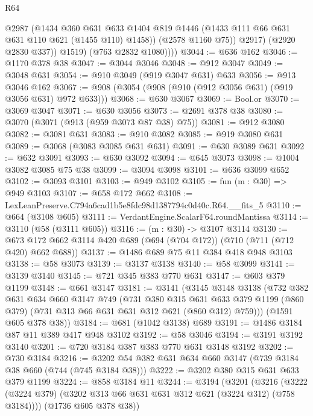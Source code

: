 \begin{lexlean}{R64}
\begin{coremodule}
                  @2987
                  (@1434
                    @360
                    @631
                    @633
                    @1404
                    @819
                    @1446
                    (@1433 @111 @66 @631 @631 @110 @621 (@1455 @110) @1458))
                  (@2578 @1160 @75))
                @2917)
              (@2920 @2830 @337))
            @1519)
          (@763 @2832 @1080))))
@3044 := @636 @162
@3046 := @1170 @378 @38
@3047 := @3044 @3046
@3048 := @912 @3047
@3049 := @3048 @631
@3054 := @910 @3049 (@919 @3047 @631) @633
@3056 := @913 @3046 @162
@3067 := @908 (@3054 (@908 (@910 (@912 @3056 @631) (@919 @3056 @631) @972 @633)))
@3068 := @630 @3067
@3069 := Bool.or
@3070 := @3069 @3047
@3071 := @630 @3056
@3073 := @2691 @378 @38
@3080 := @3070 (@3071 (@913 (@959 @3073 @87 @38) @75))
@3081 := @912 @3080
@3082 := @3081 @631
@3083 := @910 @3082
@3085 := @919 @3080 @631
@3089 := @3068 (@3083 @3085 @631 @631)
@3091 := @630 @3089 @631
@3092 := @632 @3091
@3093 := @630 @3092
@3094 := @645 @3073
@3098 := @1004 @3082 @3085 @75 @38
@3099 := @3094 @3098
@3101 := @636 @3099 @652
@3102 := @3093 @3101
@3103 := @949 @3102
@3105 := fun (m : @30) => @949 @3103
@3107 := @658 @172 @662
@3108 := LexLeanPreserve.C794a6cad1b5e8fdc98d1387794c0d40c.R64.__fits_5
@3110 := @664 (@3108 @605)
@3111 := VerdantEngine.ScalarF64.roundMantissa
@3114 := @3110 (@58 (@3111 @605))
@3116 := (m : @30) -> @3107 @3114
@3130 := @673 @172 @662 @3114 @420 @689 (@694 (@704 @172)) (@710 (@711 (@712 @420) @662 @688))
@3137 := @1486 @689 @75 @11 @384 @418 @948 @3103
@3138 := @58 @3073
@3139 := @3137 @3138
@3140 := @58 @3099
@3141 := @3139 @3140
@3145 := @721 @345 @383 @770 @631
@3147 := @603 @379 @1199
@3148 := @661 @3147
@3181 := @3141
    (@3145
      @3148
      @3138
      (@732
        @382
        @631
        @634
        @660
        @3147
        @749
        (@731
          @380
          @315
          @631
          @633
          @379
          @1199
          (@860 @379)
          (@731 @313 @66 @631 @631 @312 @621 (@860 @312) @759)))
      (@1591 @605 @378 @38))
@3184 := @681 (@1042 @3138) @689
@3191 := @1486 @3184 @87 @11 @389 @417 @948 @3102
@3192 := @58 @3046
@3194 := @3191 @3192 @3140
@3201 := @720 @3184 @387 @383 @770 @631 @3148 @3192
@3202 := @730 @3184
@3216 := @3202 @54 @382 @631 @634 @660 @3147 (@739 @3184 @38 @660 (@744 (@745 @3184 @38)))
@3222 := @3202 @380 @315 @631 @633 @379 @1199
@3224 := @858 @3184 @11
@3244 := @3194
    (@3201
      (@3216 (@3222 (@3224 @379) (@3202 @313 @66 @631 @631 @312 @621 (@3224 @312) (@758 @3184))))
      (@1736 @605 @378 @38))

\end{coremodule}
\end{lexlean}
